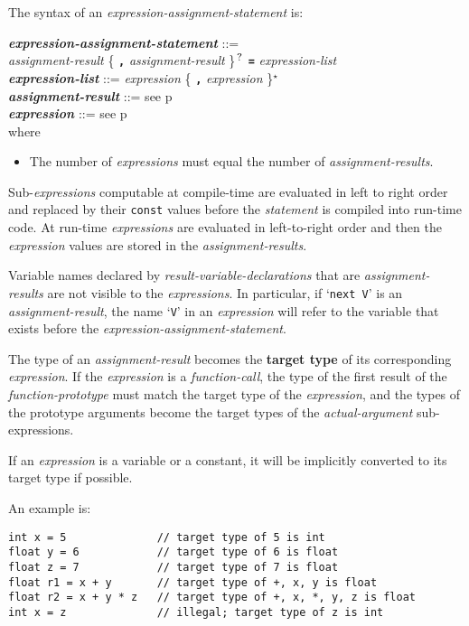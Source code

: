 \documentclass[12pt]{article}
\newcommand{\TT}[1]{{\tt \bfseries #1}}
\newcommand{\STAR}{{\Large $^\star$}}
\newcommand{\QMARK}{{$^{\,\mbox{\footnotesize ?}}$}}
\newcommand{\key}[1]{{\rm \bfseries #1}}
\newcommand{\emkey}[1]{{\em \bfseries #1}}
\newcommand{\pagref}[1]{p\pageref{#1}}
\newenvironment{indpar}[1][0.3in]%
	{\begin{list}{}%
		     {\setlength{\itemsep}{0in}%
		      \setlength{\topsep}{0in}%
		      \setlength{\parsep}{1ex}%
		      \setlength{\labelwidth}{#1}%
		      \setlength{\leftmargin}{#1}%
		      \addtolength{\leftmargin}{\labelsep}}%
	 \item}%
	{\end{list}}
\begin{document}
The syntax of an {\em expression-assign\-ment-statement} is:
\begin{indpar}
\emkey{expression-assignment-statement} ::= \\
\hspace*{0.5in} {\em assignment-result}
                \{ \TT{,} {\em assignment-result} \}\QMARK{}
		\TT{=} {\em expression-list}
\\[0.5ex]
\emkey{expression-list}\label{EXPRESSION-LIST} ::=
	      {\em expression} \{ \TT{,} {\em expression} \}\STAR{}
\\[0.5ex]
\emkey{assignment-result} ::= see \pagref{ASSIGNMENT-RESULT}
\\[0.5ex]
\emkey{expression} ::= see \pagref{EXPRESSION}
\\[2.0ex]
where
\begin{itemize}

\item The number of {\em expressions} must equal the number
of {\em assignment-results}.

\end{itemize}
\end{indpar}

Sub-{\em expressions} computable at compile-time are evaluated
in left to right order and replaced by their {\tt const} values
before the {\em statement} is compiled into run-time code.
At run-time {\em expressions} are evaluated in left-to-right order and
then the {\em expression} values are stored in the {\em assignment-results}.

Variable names declared by {\em result-variable-declarations} that are
{\em assignment-results} are not visible to the {\em expressions}.
In particular, if `{\tt next V}' is an {\em assignment-result},
the name `{\tt V}' in an {\em expression} will refer to the variable
that exists before the {\em expression-assignment-statement}.

The type of an {\em assignment-result} becomes the \key{target type}
of its corresponding {\em expression}.  If the {\em expression}
is a {\em function-call}, the type of the first result of the
{\em function-prototype} must match the target type of the {\em expression},
and the types of the prototype arguments become the target types
of the {\em actual-argument} sub-expressions.

If an {\em expression} is a variable or a constant, it will be implicitly
converted to its target type if possible.

An example is:
\begin{indpar}\begin{verbatim}
int x = 5              // target type of 5 is int
float y = 6            // target type of 6 is float
float z = 7            // target type of 7 is float
float r1 = x + y       // target type of +, x, y is float
float r2 = x + y * z   // target type of +, x, *, y, z is float
int x = z              // illegal; target type of z is int
\end{verbatim}\end{indpar}
\end{document}
